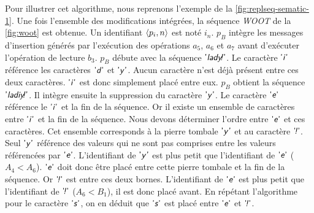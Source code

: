 Pour illustrer cet algorithme, nous reprenons l'exemple de la \autoref{fig:replseq-sematic-1}.
Une fois l'ensemble des modifications intégrées, la séquence \emph{WOOT} de la \autoref{fig:woot} est obtenue.
Un identifiant $\tuple*{p_i, n}$ est noté $i_n$.
$p_B$ intègre les messages d'insertion générés par l'exécution des opérations $a_5$, $a_6$ et $a_7$ avant d'exécuter l'opération de lecture $b_3$.
$p_B$ débute avec la séquence $\textsf{'\textit{lady\negthinspace!}'}$.
Le caractère $\textsf{'\textit{i}'}$ référence les caractères $\textsf{'\textit{d}'}$ et $\textsf{'\textit{y}'}$.
Aucun caractère n'est déjà présent entre ces deux caractères.
$\textsf{'\textit{i}'}$ est donc simplement placé entre eux.
$p_B$ obtient la séquence $\textsf{'\textit{ladiy\negthinspace!}'}$.
Il intègre ensuite la suppression du caractère $\textsf{'\textit{y}'}$.
Le caractère $\textsf{'\textit{e}'}$ référence le $\textsf{'\textit{i}'}$ et la fin de la séquence.
Or il existe un ensemble de caractères entre $\textsf{'\textit{i}'}$ et la fin de la séquence.
Nous devons déterminer l'ordre entre $\textsf{'\textit{e}'}$ et ces caractères.
Cet ensemble corresponds à la pierre tombale $\textsf{'\textit{y}'}$ et au caractère $\textsf{'\textit{\negthinspace!}'}$.
Seul $\textsf{'\textit{y}'}$ référence des valeurs qui ne sont pas comprises entre les valeurs référencées par $\textsf{'\textit{e}'}$.
L'identifiant de $\textsf{'\textit{y}'}$ est plus petit que l'identifiant de $\textsf{'\textit{e}'}$ ($A_4 < A_6$).
$\textsf{'\textit{e}'}$ doit donc être placé entre cette pierre tombale et la fin de la séquence.
Or $\textsf{'\textit{\negthinspace!}'}$ est entre ces deux bornes.
L'identifiant de $\textsf{'\textit{e}'}$ est plus petit que l'identifiant de $\textsf{'\textit{\negthinspace!}'}$ ($A_6 < B_1$), il est donc placé avant.
En répétant l'algorithme pour le caractère $\textsf{'\textit{s}'}$, on en déduit que $\textsf{'\textit{s}'}$ est placé entre $\textsf{'\textit{e}'}$ et $\textsf{'\textit{\negthinspace!}'}$.



